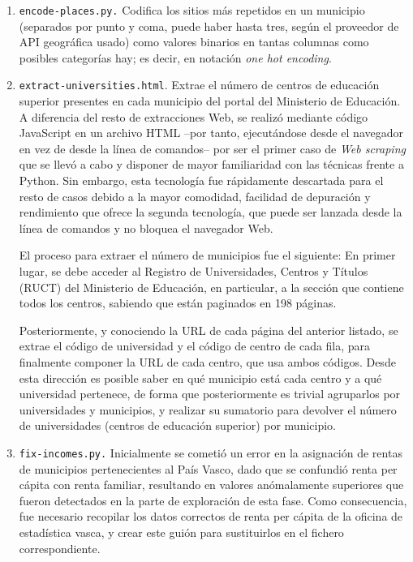 \begin{enumerate}
    \item \texttt{encode-places.py.} Codifica los sitios más repetidos en un municipio (separados por punto y coma, puede haber hasta tres, según el proveedor de API geográfica usado) como valores binarios en tantas columnas como posibles categorías hay; es decir, en notación \textit{one hot encoding}.
    
    \item \texttt{extract-universities.html}. Extrae el número de centros de educación superior presentes en cada municipio del portal del Ministerio de Educación. A diferencia del resto de extracciones Web, se realizó mediante código JavaScript en un archivo HTML –por tanto, ejecutándose desde el navegador en vez de desde la línea de comandos– por ser el primer caso de \textit{Web scraping} que se llevó a cabo y disponer de mayor familiaridad con las técnicas frente a Python. Sin embargo, esta tecnología fue rápidamente descartada para el resto de casos debido a la mayor comodidad, facilidad de depuración y rendimiento que ofrece la segunda tecnología, que puede ser lanzada desde la línea de comandos y no bloquea el navegador Web.

    El proceso para extraer el número de municipios fue el siguiente: En primer lugar, se debe acceder al Registro de Universidades, Centros y Títulos (RUCT) del Ministerio de Educación, en particular, a la sección que contiene todos los centros, sabiendo que están paginados en 198 páginas.

    Posteriormente, y conociendo la URL de cada página del anterior listado, se extrae el código de universidad y el código de centro de cada fila, para finalmente componer la URL de cada centro, que usa ambos códigos. Desde esta dirección es posible saber en qué municipio está cada centro y a qué universidad pertenece, de forma que posteriormente es trivial agruparlos por universidades y municipios, y realizar su sumatorio para devolver el número de universidades (centros de educación superior) por municipio.

    
    \item \texttt{fix-incomes.py.} Inicialmente se cometió un error en la asignación de rentas de municipios pertenecientes al País Vasco, dado que se confundió renta per cápita con renta familiar, resultando en valores anómalamente superiores que fueron detectados en la parte de exploración de esta fase. Como consecuencia, fue necesario recopilar los datos correctos de renta per cápita de la oficina de estadística vasca, y crear este guión para sustituirlos en el fichero correspondiente.


\end{enumerate}
